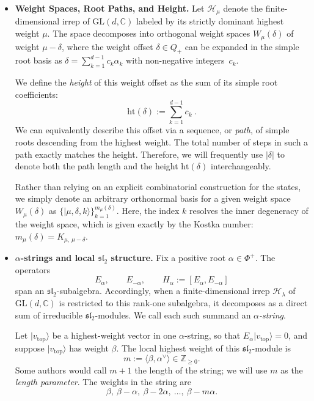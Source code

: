 \documentclass[a4paper,onecolumn,11pt]{quantumarticle}
\newcommand{\ket}[1]{| #1 \rangle}
\def\h{\mathcal{H}}
\begin{document}
\begin{itemize}
\item\textbf{Weight Spaces, Root Paths, and Height.}
Let $\h_\mu$ denote the finite-dimensional irrep of $\mathrm{GL}(d,\mathbb{C})$ labeled by its strictly dominant highest weight $\mu$. The space decomposes into orthogonal weight spaces $W_\mu(\delta)$ of weight $\mu-\delta$, where the weight offset $\delta \in Q_+$ can be expanded in the simple root basis as $\delta = \sum_{k=1}^{d-1} c_k \alpha_k$ with non-negative integers~$c_k$.

We define the \emph{height} of this weight offset as the sum of its simple root coefficients:
\begin{equation}
    \mathrm{ht}(\delta) := \sum_{k=1}^{d-1} c_k \ .
\end{equation}
We can equivalently describe this offset via a sequence, or \emph{path}, of simple roots descending from the highest weight. The total number of steps in such a path exactly matches the height. Therefore, we will frequently use $|\delta|$ to denote both the path length and the height $\mathrm{ht}(\delta)$ interchangeably.

Rather than relying on an explicit combinatorial construction for the states, we simply denote an arbitrary orthonormal basis for a given weight space $W_\mu(\delta)$ as $\{\ket{\mu, \delta, k}\}_{k=1}^{m_\mu(\delta)}$. Here, the index $k$ resolves the inner degeneracy of the weight space, which is given exactly by the Kostka number: $m_\mu(\delta) = K_{\mu,\,\mu-\delta}$.

\item\textbf{\(\alpha\)-strings and local \(\mathfrak{sl}_2\) structure.}
Fix a positive root \(\alpha\in \Phi^+\). The operators
\[
E_\alpha,\qquad E_{-\alpha},\qquad H_\alpha:=[E_\alpha,E_{-\alpha}]
\]
span an \(\mathfrak{sl}_2\)-subalgebra. Accordingly, when a finite-dimensional irrep \(\h_\lambda\) of \(\mathrm{GL}(d,\mathbb C)\) is restricted to this rank-one subalgebra, it decomposes as a direct sum of irreducible \(\mathfrak{sl}_2\)-modules. We call each such summand an \emph{\(\alpha\)-string}.

Let \(\ket{v_{\mathrm{top}}}\) be a highest-weight vector in one \(\alpha\)-string, so that \(E_\alpha \ket{v_{\mathrm{top}}}=0\), and suppose \(\ket{v_{\mathrm{top}}}\) has weight \(\beta\). The local highest weight of this \(\mathfrak{sl}_2\)-module is
\begin{equation}
    m:=\langle \beta,\alpha^\vee\rangle \in \mathbb Z_{\ge 0}.
\end{equation}
Some authors would call \(m+1\) the length of the string; we will use \(m\) as the \emph{length parameter}. The weights in the string are
\[
\beta,\ \beta-\alpha,\ \beta-2\alpha,\ \dots,\ \beta-m\alpha.
\]


\end{itemize}
\end{document}
